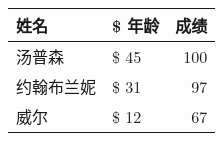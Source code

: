 \documentclass[UTF8, fontset=ubuntu]{ctexart}
\begin{document}
\begin{tabular}{|l>{\$}l|r|}
	\hline
	姓名 & 年龄 & 成绩\\
	\hline
	汤普森 & 45 & 100\\
	\hline
	约翰布兰妮 & 31 &97\\
	\hline
	威尔 & 12 & 67\\
	\hline
\end{tabular}
\end{document}
